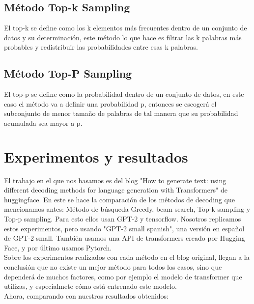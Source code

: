 \documentclass[10pt,twocolumn]{article}
\theoremstyle{definition}
\begin{document}
\subsection{Método Top-k Sampling}
El top-k se define como los k elementos más frecuentes dentro de un conjunto de datos y su determinación, este método lo que hace es filtrar las  k palabras más probables y redistribuir las probabilidades entre esas k palabras.

\subsection{Método Top-P Sampling}
El top-p se define como la probabilidad dentro de un conjunto de datos, en este caso el método va a definir una probabilidad p, entonces se escogerá el subconjunto de menor tamaño de palabras de tal manera que su probabilidad acumulada sea mayor a p.

\section{Experimentos y resultados}
El trabajo en el que nos basamos es del blog "How to generate text: using different decoding methods for language generation with Transformers" de huggingface. En este se hace la comparación de los métodos de decoding que mencionamos antes: Método de búsqueda Greedy, beam search, Top-k sampling y Top-p sampling. Para esto ellos usan GPT-2 y tensorflow. Nosotros replicamos estos experimentos, pero usando "GPT-2 small spanish", una versión en español de GPT-2 small. También usamos una API de transformers creado por Hugging Face, y por último usamos Pytorch. \\
Sobre los experimentos realizados con cada método en el blog original, llegan a la conclusión que no existe un mejor método para todos los casos, sino que dependerá de muchos factores, como por ejemplo el modelo de transformer que utilizas, y especialmete cómo está entrenado este modelo. \\
Ahora, comparando con nuestros resultados obtenidos: \\
\end{document}
